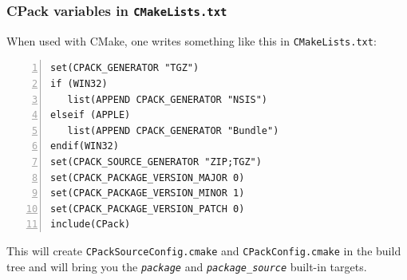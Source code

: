 \documentclass[compress,slidestop,table
              ]
               {beamer}
\newcommand{\fname}[1]{\texttt{#1}}
\begin{document}
\begin{frame}[fragile]
\frametitle{CPack variables in \fname{CMakeLists.txt}}
When used with CMake, one writes something like this in \fname{CMakeLists.txt}:
\begin{lstlisting}[basicstyle=\scriptsize,numbers=left]
set(CPACK_GENERATOR "TGZ")
if (WIN32)
   list(APPEND CPACK_GENERATOR "NSIS")
elseif (APPLE)
   list(APPEND CPACK_GENERATOR "Bundle")
endif(WIN32)
set(CPACK_SOURCE_GENERATOR "ZIP;TGZ")
set(CPACK_PACKAGE_VERSION_MAJOR 0)
set(CPACK_PACKAGE_VERSION_MINOR 1)
set(CPACK_PACKAGE_VERSION_PATCH 0)
include(CPack)
\end{lstlisting}
This will create \fname{CPackSourceConfig.cmake} and \fname{CPackConfig.cmake}
in the build tree and will bring you the \emph{\fname{package}} and \emph{\fname{package\_source}}
built-in targets.
\end{frame}
\end{document}
